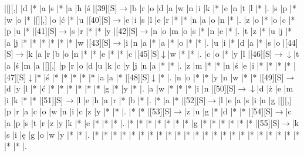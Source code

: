 \documentclass[11pt]{article}
\newcommand\drarr{$\rightarrow \!\!\!\!\! \downarrow$}
\newcommand\rarr{$\rightarrow$}
\newcommand\darr{$\downarrow$}
\begin{document}
\begin{Puzzle}{24}{28}
|[][,]{ }	|d	|*	|a	|s	|*	|a	|h	|ś	|[39][S]\rarr	|b	|r	|o	|d	|a	|w	|n	|i	|k	|*	|e	|n	|t	|l	|*	|.
|s	|p	|*	|w	|o	|*	|[][,]{ }	|o	|ć	|*	|u	|[40][S]\rarr	|e	|i	|s	|l	|e	|r	|*	|*	|n	|a	|o	|n	|*	|.
|z	|o	|*	|o	|c	|*	|p	|u	|*	|[41][S]\rarr	|s	|r	|*	|*	|y	|[42][S]\rarr	|n	|o	|m	|o	|s	|*	|n	|e	|*	|.
|t	|z	|*	|u	|j	|*	|a	|j	|*	|*	|*	|*	|*	|*	|w	|[43][S]\rarr	|i	|n	|a	|*	|a	|*	|o	|*	|*	|.
|u	|i	|*	|d	|a	|*	|s	|o	|[44][S]\rarr	|k	|a	|r	|b	|o	|n	|*	|*	|e	|*	|*	|c	|[45][S]\darr	|w	|*	|*	|.
|c	|o	|*	|y	|l	|[46][S]\drarr	|t	|a	|ś	|m	|a	|[][,]{ }	|p	|r	|o	|d	|u	|k	|c	|y	|j	|n	|a	|*	|*	|.
|z	|m	|*	|*	|n	|ś	|e	|i	|*	|*	|*	|*	|[47][S]\darr	|*	|ś	|*	|*	|*	|*	|*	|a	|a	|*	|[48][S]\darr	|*	|.
|n	|o	|*	|*	|y	|n	|w	|*	|*	|[49][S]\rarr	|d	|y	|l	|*	|ć	|*	|*	|*	|*	|*	|*	|g	|*	|y	|*	|.
|a	|w	|*	|*	|*	|i	|n	|[50][S]\drarr	|d	|ż	|e	|m	|i	|k	|*	|*	|[51][S]\rarr	|l	|e	|h	|a	|r	|*	|b	|*	|.
|*	|a	|*	|[52][S]\rarr	|l	|e	|a	|s	|i	|n	|g	|[][,]{ }	|p	|r	|a	|c	|o	|w	|n	|i	|c	|z	|y	|*	|*	|.
|*	|*	|[53][S]\rarr	|z	|u	|g	|*	|d	|*	|*	|[54][S]\rarr	|c	|a	|p	|s	|t	|r	|z	|y	|k	|*	|e	|*	|*	|*	|.
|*	|*	|*	|*	|*	|*	|*	|g	|*	|*	|*	|*	|*	|*	|[55][S]\rarr	|k	|s	|i	|ę	|g	|o	|w	|y	|*	|*	|.
|*	|*	|*	|*	|*	|*	|*	|*	|*	|*	|*	|*	|*	|*	|*	|*	|*	|*	|*	|*	|*	|*	|*	|*	|*	|.\end{Puzzle}

\newpage
\end{document}
